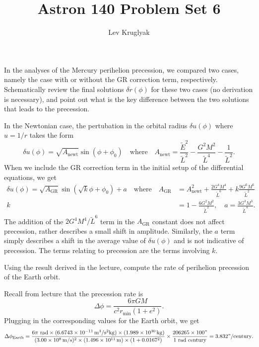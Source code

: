 \documentclass{../../templates/lkx_pset}
\title{Astron 140 Problem Set 6}
\author{Lev Kruglyak}
\begin{document}
\maketitle

\begin{problem}{1}
In the analyses of the Mercury perihelion precession, we compared two cases, namely the case with or without the GR correction term, respectively. Schematically review the final solutions $\delta r(\phi)$ for these two cases (no derivation is necessary), and point out what is the key difference between the two solutions that leads to the precession.
\end{problem}

\begin{solution}
	In the Newtonian case, the pertubation in the orbital radius $\delta u(\phi)$ where $u=1/r$ takes the form
	\[
		\delta u(\phi) = \sqrt{A_{\textrm{newt}}} \sin(\phi + \phi_0)\quad\textrm{where}\quad A_{\textrm{newt}} = \frac{\widetilde{E}^2}{\widetilde{L}^2} - \frac{G^2M^2}{\widetilde{L}^4} - \frac{1}{\widetilde{L}^2}.
	\]
	When we include the GR correction term in the initial setup of the differential equations, we get
	\[
		\begin{aligned}
			\delta u(\phi) = \sqrt{A_{\textrm{GR}}} \sin(\sqrt{k}\phi + \phi_0) + a\quad\textrm{where}\quad A_{\textrm{GR}} &= A_{\textrm{newt}}^2 + \frac{2G^4M^4}{\widetilde{L}^6} + k\frac{9G^6M^6}{\widetilde{L}^2}\\
			k &= 1-\frac{6G^2M^2}{\widetilde{L}^2},\quad a = \frac{3G^3M^3}{\widetilde{L}^4}.
		\end{aligned}
	\]
	The addition of the $2G^4M^4/\widetilde{L}^6$ term in the $A_{\textrm{GR}}$ constant does not affect precession, rather describes a small shift in amplitude. Similarly, the $a$ term simply describes a shift in the average value of $\delta u(\phi)$ and is not indicative of precession. The terms relating to precession are the terms involving $k$.
\end{solution}


\begin{problem}{2}
Using the result derived in the lecture, compute the rate of perihelion precession of the Earth orbit.
\end{problem}

\begin{solution}
  Recall from lecture that the precession rate is
  \[\Delta \phi = \frac{6\pi G M}{c^2 r_{\textrm{min}}(1+e^2)}.\]
  Plugging in the corresponding values for the Earth orbit, we get
  \[
    \Delta \phi_{\textrm{Earth}} = \frac{6\pi\textrm{ rad} \times (\Gsi{6.6743e-11})\times (\kgsi{1.989e30})}{(\mpssi{3.00e8})^2\times (\msi{1.496e11})\times (1+0.0167^2)}\times\frac{206265\times 100 "}{1\textrm{ rad}\textrm{ century}} = 3.832" / \textrm{century}.
  \]
\end{solution}
\end{document}
